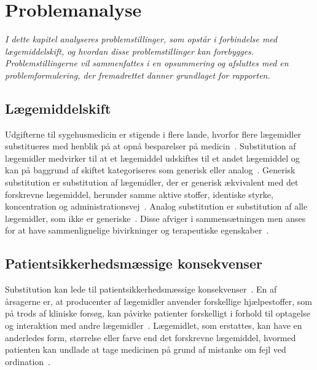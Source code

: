 \chapter{Problemanalyse}
\textit{I dette kapitel analyseres problemstillinger, som opstår i forbindelse med lægemiddelskift, og hvordan disse problemstillinger kan forebygges. Problemstillingerne vil sammenfattes i en opsummering og afsluttes med en problemformulering, der fremadrettet danner grundlaget for rapporten.}

\section{Lægemiddelskift}
Udgifterne til sygehusmedicin er stigende i flere lande, hvorfor flere lægemidler substitueres med henblik på at opnå besparelser på medicin~\citep{Ess2003,Johnston2011, Garcia2017}. Substitution af lægemidler medvirker til at et lægemiddel udskiftes til et andet lægemiddel og kan på baggrund af skiftet kategoriseres som generisk eller analog~\citep{DanskSelskabforPatientsikkerhed2009, Kairi2017}. Generisk substitution er substitution af lægemidler, der er  generisk ækvivalent med det forskrevne lægemiddel, herunder samme aktive stoffer, identiske styrke, koncentration og administrationsvej~\citep{DanskSelskabforPatientsikkerhed2009, Kairi2017, Lopes2012}. 
Analog substitution er substitution af alle lægemidler, som ikke er generiske~\citep{Kairi2017}. Disse afviger i sammensætningen men anses for at have sammenlignelige bivirkninger og terapeutiske egenskaber~\citep{DanskSelskabforPatientsikkerhed2009, Kairi2017}.


\section{Patientsikkerhedsmæssige konsekvenser} \label{sec:ProblemLaeg} 
Substitution kan lede til patientsikkerhedsmæssige konsekvenser~\citep{DanskSelskabforPatientsikkerhed2009}. En af årsagerne er, at producenter af lægemidler anvender forskellige hjælpestoffer, som på trods af kliniske forsøg, kan påvirke patienter forskelligt i forhold til optagelse og interaktion med andre lægemidler~\citep{Kairi2017}. Lægemidlet, som erstattes, kan have en anderledes form, størrelse eller farve end det forskrevne lægemiddel, hvormed patienten kan undlade at tage medicinen på grund af mistanke om fejl ved ordination~\citep{Kairi2017}. 

